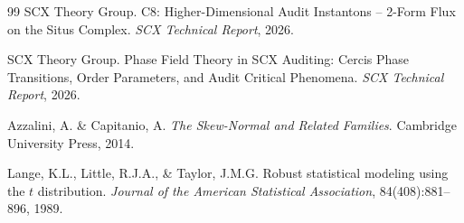 \documentclass[12pt,a4paper]{article}
\theoremstyle{plain}
\theoremstyle{definition}
\theoremstyle{remark}
\newcommand{\SCX}{\textsf{SCX}}
\begin{document}
\begin{thebibliography}{99}
\SCX{} Theory Group. C8: Higher-Dimensional Audit Instantons -- 2-Form Flux on the Situs Complex. \textit{\SCX{} Technical Report}, 2026.

\SCX{} Theory Group. Phase Field Theory in \SCX{} Auditing: Cercis Phase Transitions, Order Parameters, and Audit Critical Phenomena. \textit{\SCX{} Technical Report}, 2026.

Azzalini, A. \& Capitanio, A. \textit{The Skew-Normal and Related Families}. Cambridge University Press, 2014.

Lange, K.L., Little, R.J.A., \& Taylor, J.M.G. Robust statistical modeling using the $t$ distribution. \textit{Journal of the American Statistical Association}, 84(408):881--896, 1989.

\end{thebibliography}
\end{document}
